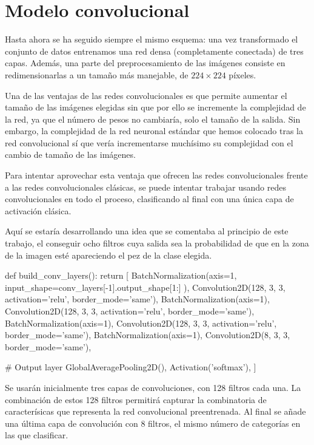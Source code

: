 \section{Modelo convolucional}

Hasta ahora se ha seguido siempre el mismo esquema: una vez transformado el conjunto de datos entrenamos una red densa (completamente conectada) de tres capas. Además, una parte del preprocesamiento de las imágenes consiste en redimensionarlas a un tamaño más manejable, de $224\times224$ píxeles.

Una de las ventajas de las redes convolucionales es que permite aumentar el tamaño de las imágenes elegidas sin que por ello se incremente la complejidad de la red, ya que el número de pesos no cambiaría, solo el tamaño de la salida. Sin embargo, la complejidad de la red neuronal estándar que hemos colocado tras la red convolucional sí que vería incrementarse muchísimo su complejidad con el cambio de tamaño de las imágenes.

Para intentar aprovechar esta ventaja que ofrecen las redes convolucionales frente a las redes convolucionales clásicas, se puede intentar trabajar usando redes convolucionales en todo el proceso, clasificando al final con una única capa de activación clásica.

Aquí se estaría desarrollando una idea que se comentaba al principio de este trabajo, el conseguir ocho filtros cuya salida sea la probabilidad de que en la zona de la imagen esté apareciendo el pez de la clase elegida.

\begin{python}
def build_conv_layers():
    return [
        BatchNormalization(axis=1,
            input_shape=conv_layers[-1].output_shape[1:]
        ),
        Convolution2D(128, 3, 3, activation='relu', border_mode='same'),
        BatchNormalization(axis=1),
        Convolution2D(128, 3, 3, activation='relu', border_mode='same'),
        BatchNormalization(axis=1),
        Convolution2D(128, 3, 3, activation='relu', border_mode='same'),
        BatchNormalization(axis=1),
        Convolution2D(8, 3, 3, border_mode='same'),

        # Output layer
        GlobalAveragePooling2D(),
        Activation('softmax'),
    ]
\end{python}

Se usarán inicialmente tres capas de convoluciones, con 128 filtros cada una. La combinación de estos 128 filtros permitirá capturar la combinatoria de caracterísicas que representa la red convolucional preentrenada. Al final se añade una última capa de convolución con 8 filtros, el mismo número de categorías en las que clasificar.

